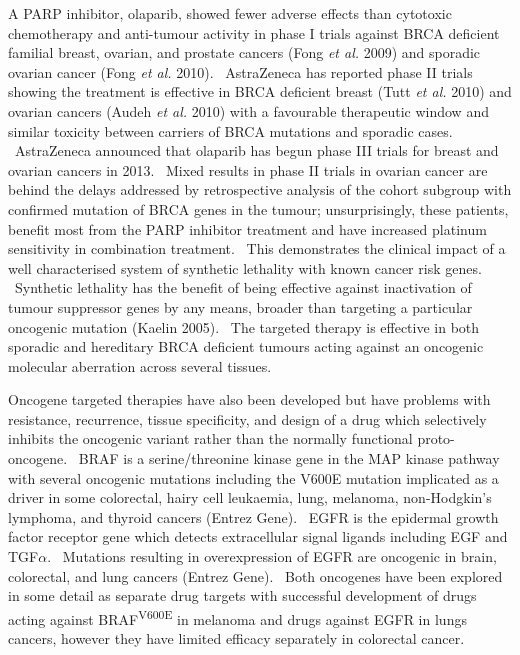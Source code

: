 A PARP inhibitor, olaparib, showed fewer adverse effects than cytotoxic chemotherapy and anti-tumour activity in phase I trials against BRCA deficient familial breast, ovarian, and prostate cancers (Fong\textit{ et al.} 2009) and sporadic ovarian cancer (Fong\textit{ et al.} 2010). \ AstraZeneca has reported phase II trials showing the treatment is effective in BRCA deficient breast (Tutt\textit{ et al.} 2010) and ovarian cancers (Audeh\textit{ et al.} 2010) with a favourable therapeutic window and similar toxicity between carriers of BRCA mutations and sporadic cases. \ AstraZeneca announced that olaparib has begun phase III trials for breast and ovarian cancers in 2013. \ Mixed results in phase II trials in ovarian cancer are behind the delays addressed by retrospective analysis of the cohort subgroup with confirmed mutation of BRCA genes in the tumour; unsurprisingly, these patients, benefit most from the PARP inhibitor treatment and have increased platinum sensitivity in combination treatment. \ This demonstrates the clinical impact of a well characterised system of synthetic lethality with known cancer risk genes. \ Synthetic lethality has the benefit of being effective against inactivation of tumour suppressor genes by any means, broader than targeting a particular oncogenic mutation (Kaelin 2005). \ The targeted therapy is effective in both sporadic and hereditary BRCA deficient tumours acting against an oncogenic molecular aberration across several tissues. \  

Oncogene targeted therapies have also been developed but have problems with resistance, recurrence, tissue specificity, and design of a drug which selectively inhibits the oncogenic variant rather than the normally functional proto-oncogene. \ BRAF is a serine/threonine kinase gene in the MAP kinase pathway with several oncogenic mutations including the V600E mutation implicated as a driver in some colorectal, hairy cell leukaemia, lung, melanoma, non-Hodgkin{\textquoteright}s lymphoma, and thyroid cancers (Entrez Gene). \ EGFR is the epidermal growth factor receptor gene which detects extracellular signal ligands including EGF and TGF$\alpha $. \ Mutations resulting in overexpression of EGFR are oncogenic in brain, colorectal, and lung cancers (Entrez Gene). \ Both oncogenes have been explored in some detail as separate drug targets with successful development of drugs acting against BRAF\textsuperscript{V600E} in melanoma and drugs against EGFR in lungs cancers, however they have limited efficacy separately in colorectal cancer. \  

